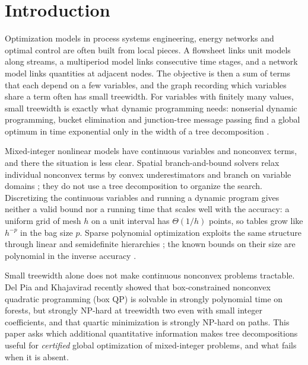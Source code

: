 \section{Introduction}\label{sec:intro}

Optimization models in process systems engineering, energy networks and
optimal control are often built from local pieces. A flowsheet links unit
models along streams, a multiperiod model links consecutive time stages, and a
network model links quantities at adjacent nodes. The objective is then a sum
of terms that each depend on a few variables, and the graph recording which
variables share a term often has small treewidth. For variables with finitely
many values, small treewidth is exactly what dynamic programming needs:
nonserial dynamic programming, bucket elimination and junction-tree message
passing find a global optimum in time exponential only in the width of a tree
decomposition \cite{BerteleBrioschi1972,Dechter1999,KollerFriedman2009}.

Mixed-integer nonlinear models have continuous variables and nonconvex
terms, and there the situation is less clear. Spatial branch-and-bound
solvers relax individual nonconvex terms by convex underestimators and branch
on variable domains \cite{TawarmalaniSahinidis2005,BelottiEtAl2009,
MisenerFloudas2014,BelottiEtAl2013}; they do not use a tree decomposition to
organize the search. Discretizing the continuous variables and running a
dynamic program gives neither a valid bound nor a running time that scales
well with the accuracy: a uniform grid of mesh $h$ on a unit interval has
$\Theta(1/h)$ points, so tables grow like $h^{-p}$ in the bag size $p$. Sparse
polynomial optimization exploits the same structure through linear and
semidefinite hierarchies \cite{WakiEtAl2006,Lasserre2006,BienstockMunoz2018};
the known bounds on their size are polynomial in the inverse accuracy
\cite{BienstockMunoz2018,KordaMagronRiosZertuche2025}.

Small treewidth alone does not make continuous nonconvex problems
tractable. Del Pia and Khajavirad \cite{DelPiaKhajavirad2026} recently showed
that box-constrained nonconvex quadratic programming (box QP) is solvable in
strongly polynomial time on forests, but strongly NP-hard at treewidth two even with
small integer coefficients, and that quartic minimization is strongly NP-hard
on paths. This paper asks which additional quantitative information makes
tree decompositions useful for \emph{certified} global optimization of
mixed-integer problems, and what fails when it is absent.

